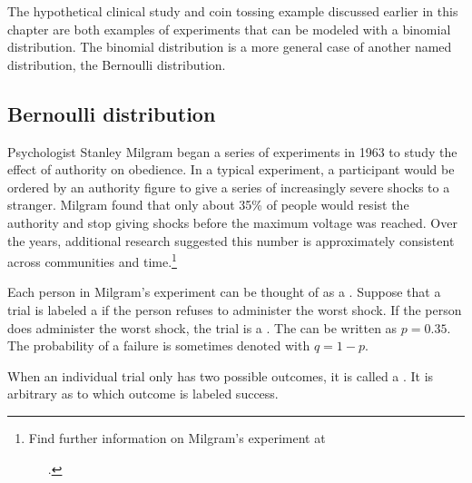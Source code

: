 The hypothetical clinical study and coin tossing example discussed earlier in this chapter are both examples of experiments that can be modeled with a binomial distribution. The binomial distribution is a more general case of another named distribution, the Bernoulli distribution.


\subsection{Bernoulli distribution}
\label{bernoulli}


Psychologist Stanley Milgram began a series of experiments in 1963 to study the effect of authority on obedience. In a typical experiment, a participant would be ordered by an authority figure to give a series of increasingly severe shocks to a stranger. Milgram found that only about 35\% of people would resist the authority and stop giving shocks before the maximum voltage was reached. Over the years, additional research suggested this number is approximately consistent across communities and time.\footnote{Find further information on Milgram's experiment at \par \ \ \hspace{0.2mm}\ .}

Each person in Milgram's experiment can be thought of as a . Suppose that a trial is labeled a  if the person refuses to administer the worst shock. If the person does administer the worst shock, the trial is a . The  can be written as $p=0.35$. The probability of a failure is sometimes denoted with $q=1-p$.

When an individual trial only has two possible outcomes, it is called a . It is arbitrary as to which outcome is labeled success. 

